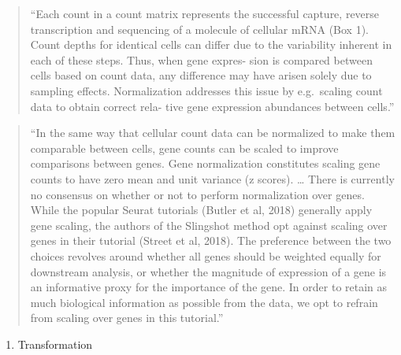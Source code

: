 \documentclass[
]{book}
\providecommand{\tightlist}{%
  \setlength{\itemsep}{0pt}\setlength{\parskip}{0pt}}
\begin{document}
\begin{quote}
``Each count in a count matrix represents the successful capture, reverse
transcription and sequencing of a molecule of cellular mRNA (Box 1). Count
depths for identical cells can differ due to the variability inherent in each of
these steps. Thus, when gene expres- sion is compared between cells based on
count data, any difference may have arisen solely due to sampling effects.
Normalization addresses this issue by e.g.~scaling count data to obtain correct
rela- tive gene expression abundances between cells.'' \citep{luecken2019current}
\end{quote}

\begin{quote}
``In the same way that cellular count data can be normalized to make them
comparable between cells, gene counts can be scaled to improve comparisons
between genes. Gene normalization constitutes scaling gene counts to have zero
mean and unit variance (z scores). \ldots{} There is currently no consensus on
whether or not to perform normalization over genes. While the popular Seurat
tutorials (Butler et al, 2018) generally apply gene scaling, the authors of the
Slingshot method opt against scaling over genes in their tutorial (Street et al,
2018). The preference between the two choices revolves around whether all
genes should be weighted equally for downstream analysis, or whether the
magnitude of expression of a gene is an informative proxy for the importance of
the gene. In order to retain as much biological information as possible from the
data, we opt to refrain from scaling over genes in this tutorial.''
\citep{luecken2019current}
\end{quote}

\begin{enumerate}
\def\labelenumi{\arabic{enumi}.}
\setcounter{enumi}{3}
\tightlist
\item
  Transformation
\end{enumerate}
\end{document}
